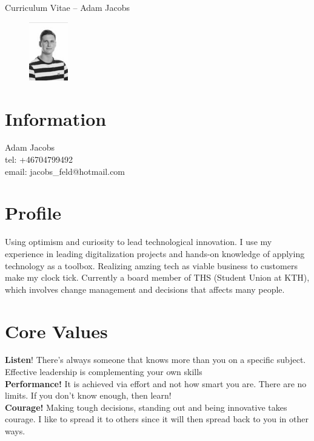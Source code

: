 \documentclass[margin,line,a4paper]{resume}
\begin{document}
{\sc \Large Curriculum Vitae -- Adam Jacobs}
\begin{resume}
    \vspace{0.01cm}
    \begin{figure}
        \vspace{-1cm}
       \begin{center}
       \includegraphics[width=0.15\textwidth]{adamjacobs}
       \end{center}
        \vspace{-1cm}
    \end{figure}
    
    \section{\mysidestyle Information}%
    Adam Jacobs \\
    tel: +46704799492 \\
    email: jacobs\_feld@hotmail.com
    \href{} \\

\section{\mysidestyle Profile}\vspace{1mm}
Using optimism and curiosity to lead technological innovation. I use my experience in leading digitalization projects and hands-on knowledge of applying technology as a toolbox. Realizing amzing tech as viable business to customers make my clock tick. Currently a board member of THS (Student Union at KTH), which involves change management and decisions that affects many people.

\section{\mysidestyle Core Values}\vspace{1mm}
    \textbf{Listen}! There's always someone that knows more than you on a specific subject. Effective leadership is complementing your own skills
    \\
     \textbf{Performance!} It is achieved via effort and not how smart you are. There are no limits. If you don't know enough, then learn!
    \\
    \textbf{Courage!} Making tough decisions, standing out and being innovative takes courage. I like to spread it to others since it will then spread back to you in other ways. 


\end{resume}
\end{document}
